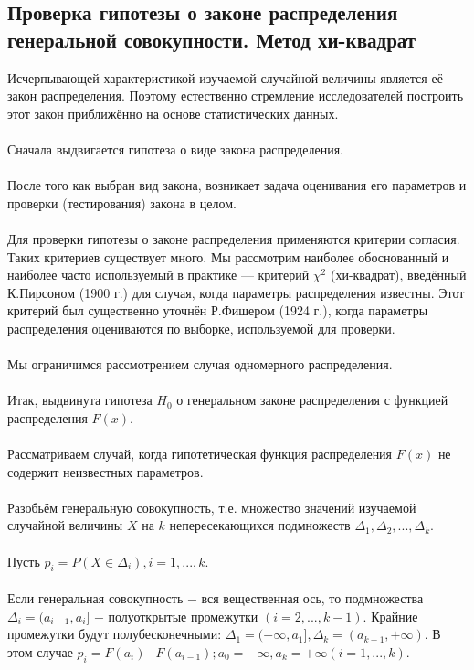 \subsection{Проверка гипотезы о законе распределения генеральной совокупности. Метод хи-квадрат}
\noindent Исчерпывающей характеристикой изучаемой случайной величины является её закон распределения. Поэтому естественно стремление исследователей построить этот закон приближённо на основе статистических данных.
\\\\
Сначала выдвигается гипотеза о виде закона распределения.
\\\\
После того как выбран вид закона, возникает задача оценивания его параметров и проверки (тестирования) закона в целом.
\\\\
Для проверки гипотезы о законе распределения применяются критерии согласия. Таких критериев существует много. Мы рассмотрим наиболее обоснованный и наиболее часто используемый в практике — критерий $\chi^{2}$ (хи-квадрат), введённый К.Пирсоном (1900 г.) для случая, когда параметры распределения известны. Этот критерий был существенно уточнён Р.Фишером (1924 г.), когда параметры распределения оцениваются по выборке, используемой для проверки.
\\\\
Мы ограничимся рассмотрением случая одномерного распределения.
\\\\
Итак, выдвинута гипотеза $H_{0}$ о генеральном законе распределения с функцией распределения $F(x)$.
\\\\
Рассматриваем случай, когда гипотетическая функция распределения $F(x)$ не содержит неизвестных параметров.
\\\\
Разобьём генеральную совокупность, т.е. множество значений изучаемой случайной величины $X$ на $k$ непересекающихся подмножеств $\Delta_{1},\Delta_{2}, ... ,\Delta_{k}$.
\\\\
Пусть $p_{i} = P(X \in \Delta_{i}), i = 1, ... ,k$. 
\\\\
Если генеральная совокупность $-$ вся вещественная ось, то подмножества $\Delta_i = (a_{i-1},a_{i}]$ $-$ полуоткрытые промежутки $(i = 2, ... ,k-1)$. Крайние промежутки будут полубесконечными: $\Delta_{1} = (-\infty,a_{1}], \Delta_{k} = (a_{k-1},+\infty).$ В этом случае $p_{i} = F(a_{i})$$-$$F(a_{i-1}); a_{0} = -\infty, a_{k} = +\infty (i = 1, ... ,k).$
